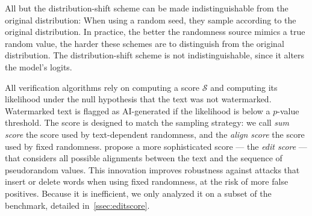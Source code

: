 


All but the distribution-shift scheme can be made indistinguishable from the original distribution:
When using a random seed, they sample according to the original distribution. 
In practice, the better the randomness source mimics a true random value,
the harder these schemes are to distinguish from the original distribution.
The distribution-shift scheme is not indistinguishable,
since it alters the model's logits. 

All verification algorithms rely on computing a score $\mathcal{S}$ and computing its likelihood under the null hypothesis that the text was not watermarked.
Watermarked text is flagged as AI-generated if the likelihood is below a $p$-value threshold.
The score is designed to match the sampling strategy: we call \emph{sum score} the score used by text-dependent randomness, and 
the \emph{align score}\cite{kuditipudi_robust_2023} the score used by fixed randomness.
\citet{kuditipudi_robust_2023} propose a more sophisticated score --- the \emph{edit score} --- that considers all 
possible alignments between the text and the sequence of pseudorandom values.
This innovation improves robustness against attacks that insert or delete words when 
using fixed randomness, at the risk of more false positives. Because it is inefficient, we 
only analyzed it on a subset of the benchmark, detailed in~\cref{ssec:editscore}.

